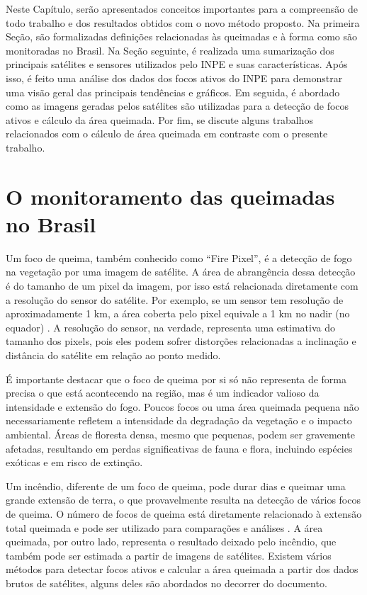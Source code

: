 \documentclass[cic,tc]{iiufrgs}
\begin{document}
Neste Capítulo, serão apresentados conceitos importantes para a compreensão de todo trabalho e dos resultados obtidos com o novo método proposto. Na primeira Seção, são formalizadas definições relacionadas às queimadas e à forma como são monitoradas no Brasil. Na Seção seguinte, é realizada uma sumarização dos principais satélites e sensores utilizados pelo INPE e suas características. Após isso, é feito uma análise dos dados dos focos ativos do INPE para demonstrar uma visão geral das principais tendências e gráficos. Em seguida, é abordado como as imagens geradas pelos satélites são utilizadas para a detecção de focos ativos e cálculo da área queimada. Por fim, se discute alguns trabalhos relacionados com o cálculo de área queimada em contraste com o presente trabalho. \par

\section{O monitoramento das queimadas no Brasil}

Um foco de queima, também conhecido como ``Fire Pixel'', é a detecção de fogo na vegetação por uma imagem de satélite. A área de abrangência dessa detecção é do tamanho de um pixel da imagem, por isso está relacionada diretamente com a resolução do sensor do satélite. Por exemplo, se um sensor tem resolução de aproximadamente 1 km, a área coberta pelo pixel equivale a 1 km no nadir (no equador) \cite{PerguntasFrequentesINPE}. A resolução do sensor, na verdade, representa uma estimativa do tamanho dos pixels, pois eles podem sofrer distorções relacionadas a inclinação e distância do satélite em relação ao ponto medido. 

É importante destacar que o foco de queima por si só não representa de forma precisa o que está acontecendo na região, mas é um indicador valioso da intensidade e extensão do fogo. Poucos focos ou uma área queimada pequena não necessariamente refletem a intensidade da degradação da vegetação e o impacto ambiental. Áreas de floresta densa, mesmo que pequenas, podem ser gravemente afetadas, resultando em perdas significativas de fauna e flora, incluindo espécies exóticas e em risco de extinção.

Um incêndio, diferente de um foco de queima, pode durar dias e queimar uma grande extensão de terra, o que provavelmente resulta na detecção de vários focos de queima. O número de focos de queima está diretamente relacionado à extensão total queimada e pode ser utilizado para comparações e análises \citep{giglio2010assessing}. A área queimada, por outro lado, representa o resultado deixado pelo incêndio, que também pode ser estimada a partir de imagens de satélites. Existem vários métodos para detectar focos ativos e calcular a área queimada a partir dos dados brutos de satélites, alguns deles são abordados no decorrer do documento. 
\end{document}
